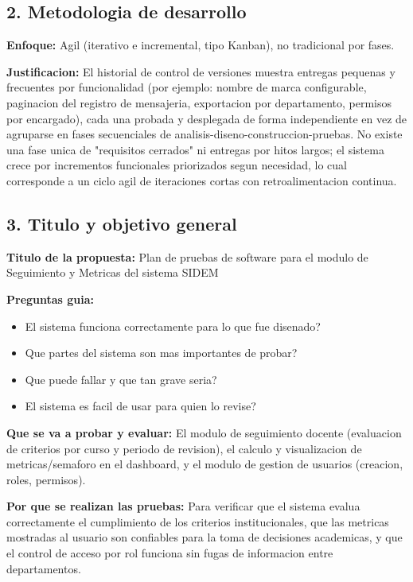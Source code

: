 \documentclass[11pt,a4paper,oneside]{report}
\begin{document}
\subsection*{2. Metodologia de desarrollo}

\textbf{Enfoque:} Agil (iterativo e incremental, tipo Kanban), no tradicional por fases.


\textbf{Justificacion:} El historial de control de versiones muestra entregas pequenas y frecuentes por funcionalidad (por ejemplo: nombre de marca configurable, paginacion del registro de mensajeria, exportacion por departamento, permisos por encargado), cada una probada y desplegada de forma independiente en vez de agruparse en fases secuenciales de analisis-diseno-construccion-pruebas. No existe una fase unica de "requisitos cerrados" ni entregas por hitos largos; el sistema crece por incrementos funcionales priorizados segun necesidad, lo cual corresponde a un ciclo agil de iteraciones cortas con retroalimentacion continua.


\subsection*{3. Titulo y objetivo general}

\textbf{Titulo de la propuesta:} Plan de pruebas de software para el modulo de Seguimiento y Metricas del sistema SIDEM


\textbf{Preguntas guia:}


\begin{itemize}
\item El sistema funciona correctamente para lo que fue disenado?
\item Que partes del sistema son mas importantes de probar?
\item Que puede fallar y que tan grave seria?
\item El sistema es facil de usar para quien lo revise?
\end{itemize}

\textbf{Que se va a probar y evaluar:} El modulo de seguimiento docente (evaluacion de criterios por curso y periodo de revision), el calculo y visualizacion de metricas/semaforo en el dashboard, y el modulo de gestion de usuarios (creacion, roles, permisos).


\textbf{Por que se realizan las pruebas:} Para verificar que el sistema evalua correctamente el cumplimiento de los criterios institucionales, que las metricas mostradas al usuario son confiables para la toma de decisiones academicas, y que el control de acceso por rol funciona sin fugas de informacion entre departamentos.
\end{document}
